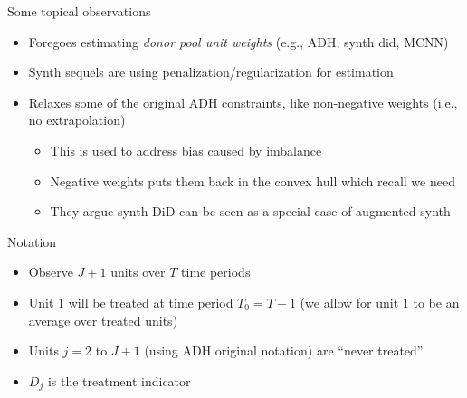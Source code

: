 \documentclass{beamer}
\begin{document}
\begin{frame}{Some topical observations}

\begin{itemize}
\item Foregoes estimating \emph{donor pool unit weights} (e.g., ADH, synth did, MCNN)
\item Synth sequels are using penalization/regularization for estimation
\item Relaxes some of the original ADH constraints, like non-negative weights (i.e., no extrapolation)
	\begin{itemize}
	\item This is used to address bias caused by imbalance
	\item Negative weights puts them back in the convex hull which recall we need
	\item They argue synth DiD can be seen as a special case of augmented synth
	\end{itemize}
\end{itemize}

\end{frame}



\begin{frame}{Notation}

\begin{itemize}
\item Observe $J+1$ units over $T$ time periods
\item Unit $1$ will be treated at time period $T_0=T-1$ (we allow for unit $1$ to be an average over treated units)
\item Units $j=2 $ to $J+1$ (using ADH original notation) are ``never treated''
\item $D_j$ is the treatment indicator
\end{itemize}

\end{frame}
\end{document}
